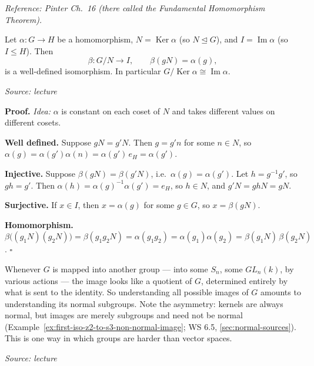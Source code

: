 \documentclass[11pt]{report}
\renewenvironment{proof}[1][Proof]{\noindent\textbf{#1.} }{\hfill$\square$\par\vspace{5pt}}
\newcommand{\srcline}[1]{\par\hfill{\footnotesize\textit{Source: #1}}}
\begin{document}
\textit{Reference: Pinter Ch.\ 16 (there called the Fundamental Homomorphism Theorem).}

\begin{thmbox}\label{thm:first-isomorphism-theorem}
Let $\alpha: G \to H$ be a homomorphism, $N = \operatorname{Ker}\alpha$ (so $N \trianglelefteq G$), and $I = \operatorname{Im}\alpha$ (so $I \leq H$). Then
\[ \beta: G/N \to I, \qquad \beta(gN) = \alpha(g), \]
is a well-defined isomorphism. In particular $G/\operatorname{Ker}\alpha \cong \operatorname{Im}\alpha$.
\srcline{lecture}
\end{thmbox}

\begin{proof}
\textit{Idea:} $\alpha$ is constant on each coset of $N$ and takes different values on different cosets.\par
\textbf{Well defined.} Suppose $gN = g'N$. Then $g = g'n$ for some $n \in N$, so $\alpha(g) = \alpha(g')\alpha(n) = \alpha(g')\,e_H = \alpha(g')$.

\textbf{Injective.} Suppose $\beta(gN) = \beta(g'N)$, i.e.\ $\alpha(g) = \alpha(g')$. Let $h = g^{-1}g'$, so $gh = g'$. Then $\alpha(h) = \alpha(g)^{-1}\alpha(g') = e_H$, so $h \in N$, and $g'N = ghN = gN$.

\textbf{Surjective.} If $x \in I$, then $x = \alpha(g)$ for some $g \in G$, so $x = \beta(gN)$.

\textbf{Homomorphism.} $\beta\big((g_1N)(g_2N)\big) = \beta(g_1g_2N) = \alpha(g_1g_2) = \alpha(g_1)\alpha(g_2) = \beta(g_1N)\,\beta(g_2N)$.
\end{proof}

\begin{center}
\label{fig:first-iso}
\end{center}

\begin{rembox}\label{rem:images-quotients}
Whenever $G$ is mapped into another group --- into some $S_n$, some $GL_n(k)$, by various actions --- the image looks like a quotient of $G$, determined entirely by what is sent to the identity. So understanding all possible images of $G$ amounts to understanding its normal subgroups. Note the asymmetry: kernels are always normal, but images are merely subgroups and need not be normal (Example~\ref{ex:first-iso-z2-to-s3-non-normal-image}; WS 6.5, \ref{sec:normal-sources}). This is one way in which groups are harder than vector spaces.
\srcline{lecture}
\end{rembox}
\end{document}
